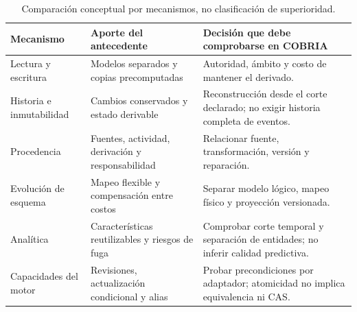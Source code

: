\begin{table}[htbp]\centering\small
\caption{Comparación conceptual por mecanismos, no clasificación de superioridad.}
\label{tab:comparacion-literatura-ep7}
\begin{tabularx}{\textwidth}{p{2.2cm}X X}\toprule
Mecanismo & Aporte del antecedente & Decisión que debe comprobarse en COBRIA\\\midrule
Lectura y escritura & Modelos separados y copias precomputadas & Autoridad, ámbito y costo de mantener el derivado.\\
Historia e inmutabilidad & Cambios conservados y estado derivable & Reconstrucción desde el corte declarado; no exigir historia completa de eventos.\\
Procedencia & Fuentes, actividad, derivación y responsabilidad & Relacionar fuente, transformación, versión y reparación.\\
Evolución de esquema & Mapeo flexible y compensación entre costos & Separar modelo lógico, mapeo físico y proyección versionada.\\
Analítica & Características reutilizables y riesgos de fuga & Comprobar corte temporal y separación de entidades; no inferir calidad predictiva.\\
Capacidades del motor & Revisiones, actualización condicional y alias & Probar precondiciones por adaptador; atomicidad no implica equivalencia ni CAS.\\
\bottomrule\end{tabularx}
\end{table}
